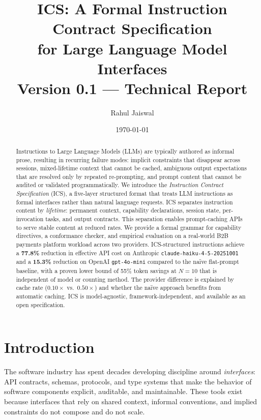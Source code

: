 \documentclass[11pt]{article}
\title{\textbf{ICS: A Formal Instruction Contract Specification\\
for Large Language Model Interfaces}\\[0.4em]
\large Version 0.1 --- Technical Report}
\author[1]{Rahul Jaiswal}
\affil[1]{Vymo Inc.}
\date{\today}
\begin{document}
\maketitle

\begin{abstract}
Instructions to Large Language Models (LLMs) are typically authored as
informal prose, resulting in recurring failure modes: implicit constraints
that disappear across sessions, mixed-lifetime context that cannot be
cached, ambiguous output expectations that are resolved only by repeated
re-prompting, and prompt content that cannot be audited or validated
programmatically. We introduce the \emph{Instruction Contract Specification}
(ICS), a five-layer structured format that treats LLM instructions as formal
interfaces rather than natural language requests. ICS separates instruction
content by \emph{lifetime}: permanent context, capability declarations,
session state, per-invocation tasks, and output contracts. This separation
enables prompt-caching APIs to serve stable content at reduced rates. We
provide a formal grammar for capability directives, a conformance checker, and
empirical evaluation on a real-world B2B payments platform workload across two
providers. ICS-structured instructions achieve a \textbf{77.8\%} reduction in
effective API cost on Anthropic \texttt{claude-haiku-4-5-20251001} and a
\textbf{15.3\%} reduction on OpenAI \texttt{gpt-4o-mini} compared to the
na\"{i}ve flat-prompt baseline, with a proven lower bound of 55\% token savings
at $N{=}10$ that is independent of model or counting method. The provider
difference is explained by cache rate ($0.10\times$ vs.\ $0.50\times$) and
whether the na\"{i}ve approach benefits from automatic caching. ICS is
model-agnostic, framework-independent, and available as an open specification.
\end{abstract}

\section{Introduction}
\label{sec:intro}

The software industry has spent decades developing discipline around
\emph{interfaces}: API contracts, schemas, protocols, and type systems that
make the behavior of software components explicit, auditable, and
maintainable. These tools exist because interfaces that rely on shared
context, informal conventions, and implied constraints do not compose and do
not scale.
\end{document}
